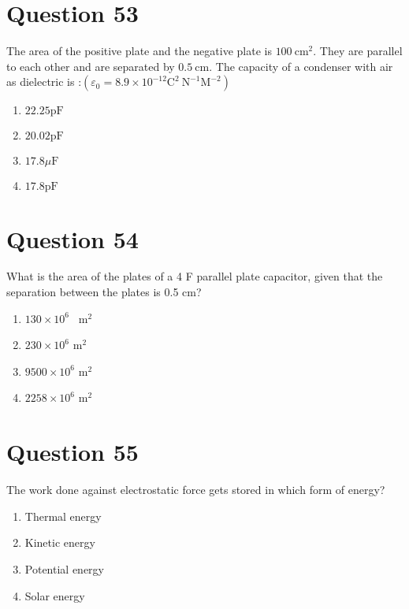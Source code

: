 \documentclass{article}
\begin{document}
\section*{Question 53}
The area of the positive plate and the negative plate is \(100 \mathrm{~cm}^2\). They are parallel to each other and are separated by \(0.5 \mathrm{~cm}\). The capacity of a condenser with air as dielectric is :\(\left(\varepsilon_0=8.9 \times 10^{-12} \mathrm{C}^2 \mathrm{~N}^{-1} \mathrm{M}^{-2}\right)\)\newline
\begin{enumerate}[label=(\alph*)]
\item \(22.25 \mathrm{pF}\)
\item \( 20.02 \mathrm{pF}\)
\item \(17.8 \mu \mathrm{F}\)
\item \(17.8 \mathrm{pF}\)
\end{enumerate}
\newpage
\section*{Question 54}
What is the area of the plates of a 4 F parallel plate capacitor, given that the separation between the plates is 0.5 cm?
\begin{enumerate}[label=(\alph*)]
\item \(130  \times 10^6\)  m$^{2}$
\item \(230  \times 10^6\) m$^{2}$
\item \(9500  \times 10^6\) m$^{2}$
\item \(2258  \times 10^6\) m$^{2}$
\end{enumerate}
\newpage
\section*{Question 55}
The work done against electrostatic force gets stored in which form of energy?
\begin{enumerate}[label=(\alph*)]
\item Thermal energy\newline
\item Kinetic energy
\item Potential energy\newline
\item Solar energy
\end{enumerate}
\newpage
\end{document}
